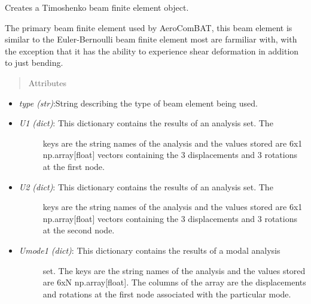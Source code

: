 \documentclass[letterpaper,10pt,english]{sphinxmanual}
\begin{document}
\begin{fulllineitems}
\label{structures:AeroComBAT.Structures.TBeam}
Creates a Timoshenko beam finite element object.

The primary beam finite element used by AeroComBAT, this beam element is
similar to the Euler-Bernoulli beam finite element most are farmiliar with,
with the exception that it has the ability to experience shear deformation
in addition to just bending.
\begin{quote}\begin{description}
\item[{Attributes}] \leavevmode
\end{description}\end{quote}
\begin{itemize}
\item {} 
\emph{type (str)}:String describing the type of beam element being used.

\item {} \begin{description}
\item[{\emph{U1 (dict)}: This dictionary contains the results of an analysis set. The}] \leavevmode
keys are the string names of the analysis and the values stored are
6x1 np.array{[}float{]} vectors containing the 3 displacements and
3 rotations at the first node.

\end{description}

\item {} \begin{description}
\item[{\emph{U2 (dict)}: This dictionary contains the results of an analysis set. The}] \leavevmode
keys are the string names of the analysis and the values stored are
6x1 np.array{[}float{]} vectors containing the 3 displacements and
3 rotations at the second node.

\end{description}

\item {} \begin{description}
\item[{\emph{Umode1 (dict)}: This dictionary contains the results of a modal analysis}] \leavevmode
set. The keys are the string names of the analysis and the values
stored are 6xN np.array{[}float{]}. The columns of the array are the
displacements and rotations at the first node associated with the
particular mode.


\end{description}
\end{itemize}
\end{fulllineitems}
\end{document}
